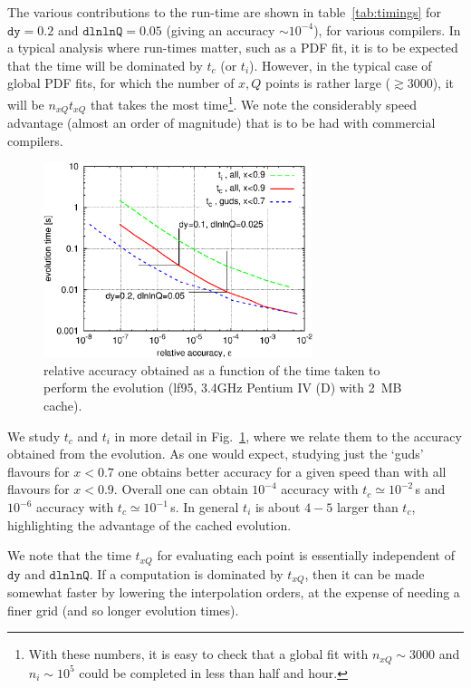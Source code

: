 \documentclass[12pt]{article}
\newcommand{\dy}{\ttt{dy}}
\newcommand{\dlnlnQ}{\ttt{dlnlnQ}}
\newcommand{\ttt}[1]{\texttt{#1}}
\begin{document}
The various contributions to the run-time are shown in
table~\ref{tab:timings} for $\dy=0.2$ and $\dlnlnQ=0.05$ (giving an
accuracy $\sim 10^{-4}$), for various compilers.  In a typical
analysis where run-times matter, such as a PDF fit, it is to be
expected that the time will be dominated by $t_c$ (or $t_i$). However,
in the typical case of global PDF fits, for which
the number of $x,Q$ points is rather large ($\gtrsim 3000$), 
 it will be $n_{xQ} t_{xQ}$ that takes the most time\footnote{
With these numbers, it is easy to check that a global fit with
$n_{xQ}\sim 3000$ and $n_i\sim 10^5$ could be completed
in less than half and hour.}. We note the
considerably speed advantage (almost an order
of magnitude) that is to be had with commercial
compilers.

\begin{figure}
  \centering
  \includegraphics[width=0.7\textwidth]{../benchmarking/test_acc/acc-v-time.eps}%
  \caption{relative accuracy obtained as a function of the time taken
    to perform the evolution (lf95, 3.4GHz Pentium IV (D) with 2~MB
    cache).}
  \label{fig:acc-v-time}
\end{figure}

We study $t_c$ and $t_i$ in more detail in Fig.~\ref{fig:acc-v-time},
where we relate them to the accuracy obtained from the evolution. As
one would expect, studying just the `guds' flavours for $x<0.7$ one
obtains better accuracy for a given speed than with all flavours for
$x<0.9$. Overall one can obtain $10^{-4}$ accuracy with $t_c \simeq
10^{-2}$\,s and $10^{-6}$ accuracy with $t_c \simeq 10^{-1}$\,s. In
general $t_i$ is about $4-5$ larger than $t_c$, highlighting the
advantage of the cached evolution. 

We note that the time $t_{xQ}$ for evaluating each point is
essentially independent of $\dy$ and $\dlnlnQ$. If a computation is
dominated by $t_{xQ}$, then it can be made somewhat faster by
lowering the interpolation orders, at the expense of needing a finer
grid (and so longer evolution times).
\end{document}
